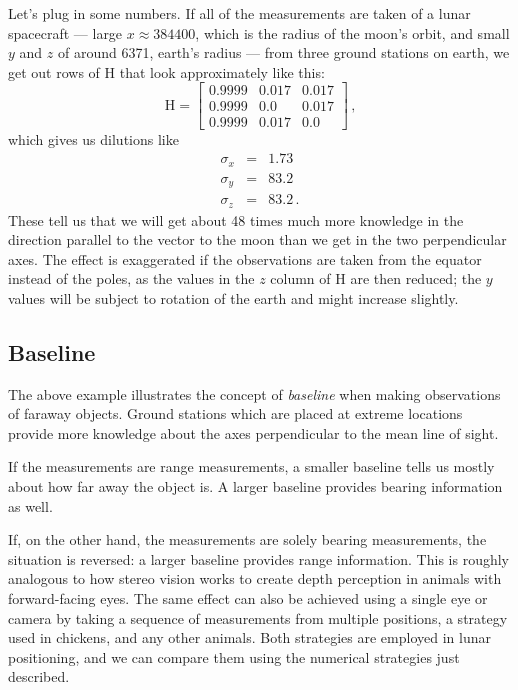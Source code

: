 \documentclass[12pt]{article}
\newcommand*\vect[1]{\mathrm{#1}}
\begin{document}
Let's plug in some numbers. If all of the measurements are taken of a lunar spacecraft --- large $x \approx 384400$, which is the radius of the moon's orbit, and small $y$ and $z$ of around 6371, earth's radius --- from three ground stations on earth, we get out rows of $\vect{H}$ that look approximately like this:
\begin{equation}
\vect{H} = \begin{bmatrix} 0.9999 & 0.017 & 0.017\\
0.9999 & 0.0 & 0.017 \\
0.9999 & 0.017 & 0.0\end{bmatrix}\,\text{,}
\end{equation}
which gives us dilutions like
\begin{eqnarray*}
\sigma_x &=& 1.73 \\
\sigma_y &=& 83.2 \\
\sigma_z &=& 83.2\,\text{.}
\end{eqnarray*}
These tell us that we will get about 48 times much more knowledge in the direction parallel to the vector to the moon than we get in the two perpendicular axes. The effect is exaggerated if the observations are taken from the equator instead of the poles, as the values in the $z$ column of $\vect{H}$ are then reduced; the $y$ values will be subject to rotation of the earth and might increase slightly.

\subsection{Baseline}
The above example illustrates the concept of \textit{baseline} when making observations of faraway objects. Ground stations which are placed at extreme locations provide more knowledge about the axes perpendicular to the mean line of sight.

If the measurements are range measurements, a smaller baseline tells us mostly about how far away the object is. A larger baseline provides bearing information as well.

If, on the other hand, the measurements are solely bearing measurements, the situation is reversed: a larger baseline provides range information. This is roughly analogous to how stereo vision works to create depth perception in animals with forward-facing eyes. The same effect can also be achieved using a single eye or camera by taking a sequence of measurements from multiple positions, a strategy used in chickens, and any other animals. Both strategies are employed in lunar positioning, and we can compare them using the numerical strategies just described.
\end{document}
